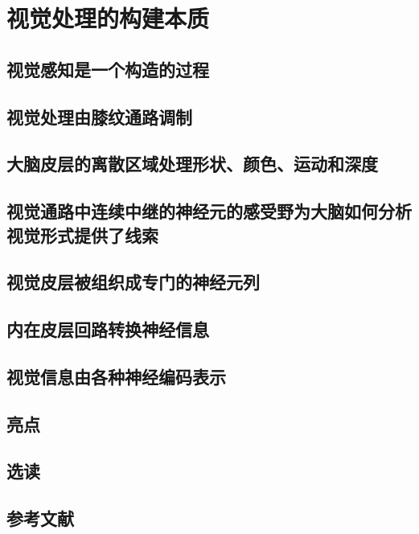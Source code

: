 \chapter{视觉处理的构建本质}

\section{视觉感知是一个构造的过程}

\section{视觉处理由膝纹通路调制}

\section{大脑皮层的离散区域处理形状、颜色、运动和深度}

\section{视觉通路中连续中继的神经元的感受野为大脑如何分析视觉形式提供了线索}

\section{视觉皮层被组织成专门的神经元列}

\section{内在皮层回路转换神经信息}

\section{视觉信息由各种神经编码表示}

\section{亮点}
\section{选读}
\section{参考文献}